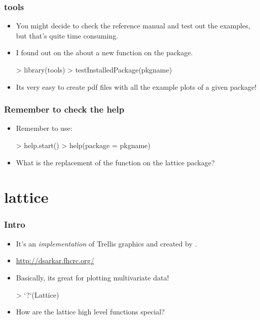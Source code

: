 \begin{frame}
  \frametitle{tools}
  \begin{itemize}
  \item You might decide to check the reference manual and test out the examples, but that's quite time consuming.
  \item I found out on the  about a new function on the  package.
\begin{Schunk}
\begin{Sinput}
> library(tools)
> testInstalledPackage(pkgname)
\end{Sinput}
\end{Schunk}
  \item Its very \alert{easy} to create pdf files with all the example plots of a given package!
  \end{itemize}
\end{frame}

\begin{frame}
  \frametitle{Remember to check the help}
  \begin{itemize}
  \item Remember to use:
\begin{Schunk}
\begin{Sinput}
> help.start()
> help(package = pkgname)
\end{Sinput}
\end{Schunk}
  \item What is the replacement of the  function on the lattice package?
  \end{itemize}
\end{frame}

\section{lattice}

\begin{frame}
  \frametitle{Intro}
  \begin{itemize}
  \item It's an \emph{implementation} of Trellis graphics and created by .
  \item \url{http://dsarkar.fhcrc.org/}
  \item Basically, its great for plotting multivariate data!
\begin{Schunk}
\begin{Sinput}
> `?`(Lattice)
\end{Sinput}
\end{Schunk}
  \item How are the lattice high level functions \alert{special}?
  \end{itemize}
\end{frame}

